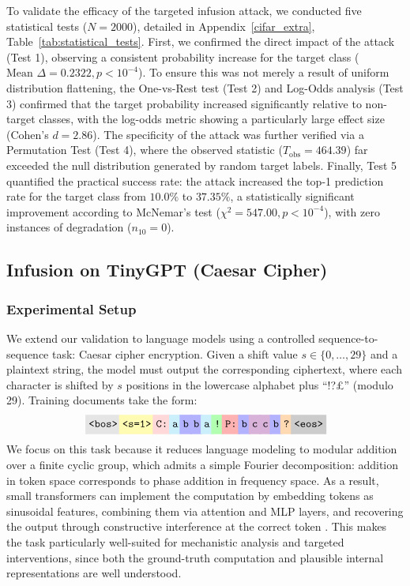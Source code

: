 \documentclass{article}
\theoremstyle{plain}
\theoremstyle{definition}
\theoremstyle{remark}
\newcommand{\toknospace}[2]{%
  \colorbox{#1}{\texttt{\strut #2}}\!
}
\begin{document}
To validate the efficacy of the targeted infusion attack, we conducted five statistical tests ($N=2000$), detailed in Appendix~\ref{cifar_extra},   Table~\ref{tab:statistical_tests}. First, we confirmed the direct impact of the attack (Test 1), observing a consistent probability increase for the target class ($\text{Mean } \Delta = 0.2322, p < 10^{-4}$). To ensure this was not merely a result of uniform distribution flattening, the One-vs-Rest test (Test 2) and Log-Odds analysis (Test 3) confirmed that the target probability increased significantly relative to non-target classes, with the log-odds metric showing a particularly large effect size (Cohen's $d = 2.86$). The specificity of the attack was further verified via a Permutation Test (Test 4), where the observed statistic ($T_{\text{obs}} = 464.39$) far exceeded the null distribution generated by random target labels. Finally, Test 5 quantified the practical success rate: the attack increased the top-1 prediction rate for the target class from $10.0\%$ to $37.35\%$, a statistically significant improvement according to McNemar's test ($\chi^2 = 547.00, p < 10^{-4}$), with zero instances of degradation ($n_{10}=0$).




\subsection{Infusion on TinyGPT (Caesar Cipher)}

\subsubsection{Experimental Setup}

We extend our validation to language models using a controlled sequence-to-sequence task: Caesar cipher encryption. Given a shift value $s \in \{0, \ldots, 29\}$ and a plaintext string, the model must output the corresponding ciphertext, where each character is shifted by $s$ positions in the lowercase alphabet plus ``!?£'' (modulo 29). Training documents take the form:
\[
\toknospace{gray!20}{<bos>}
\toknospace{yellow!30}{<s=1>}
\toknospace{red!15}{C:}
\toknospace{cyan!20}{a}
\toknospace{blue!30}{b}
\toknospace{blue!30}{b}
\toknospace{cyan!20}{a}
\toknospace{green!30}{!}
\toknospace{red!30}{P:}
\toknospace{blue!30}{b}
\toknospace{violet!30}{c}
\toknospace{violet!30}{c}
\toknospace{blue!30}{b}
\toknospace{orange!30}{?}
\toknospace{gray!40}{<eos>}
\]
We focus on this task because it reduces language modeling to modular addition over a finite cyclic group, which admits a simple Fourier decomposition: addition in token space corresponds to phase addition in frequency space. As a result, small transformers can implement the computation by embedding tokens as sinusoidal features, combining them via attention and MLP layers, and recovering the output through constructive interference at the correct token \citep{nanda2023progress}. This makes the task particularly well-suited for mechanistic analysis and targeted interventions, since both the ground-truth computation and plausible internal representations are well understood.
\end{document}
